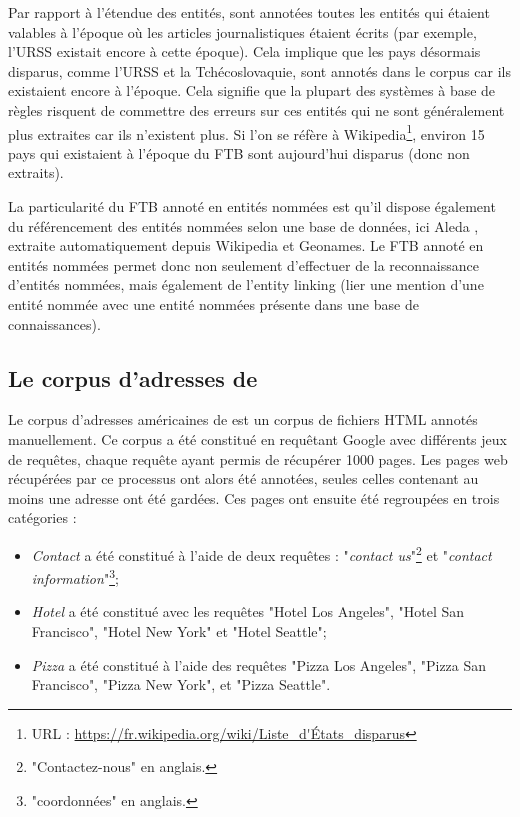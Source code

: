 \documentclass[12pt,a4paper,times,twoside,openright]{report}
\begin{document}
Par rapport à l'étendue des entités, sont annotées toutes les entités qui étaient valables à l'époque où les articles journalistiques étaient écrits (par exemple, l'URSS existait encore à cette époque). Cela implique que les pays désormais disparus, comme l'URSS et la Tchécoslovaquie, sont annotés dans le corpus car ils existaient encore à l'époque. Cela signifie que la plupart des systèmes à base de règles risquent de commettre des erreurs sur ces entités qui ne sont généralement plus extraites car ils n'existent plus. Si l'on se réfère à Wikipedia\footnote{URL : \url{https://fr.wikipedia.org/wiki/Liste_d'États_disparus}}, environ 15 pays qui existaient à l'époque du FTB sont aujourd'hui disparus (donc non extraits).

La particularité du FTB annoté en entités nommées est qu'il dispose également du référencement des entités nommées selon une base de données, ici Aleda \citep{sagot2012aleda}, extraite automatiquement depuis Wikipedia et Geonames. Le FTB annoté en entités nommées permet donc non seulement d'effectuer de la reconnaissance d'entités nommées, mais également de l'entity linking (lier une mention d'une entité nommée avec une entité nommées présente dans une base de connaissances).


        
        \subsection{Le corpus d'adresses de \citet{yu2007high}}
        \label{subsec:corpus-adresses}
Le corpus d'adresses américaines de \citet{yu2007high} est un corpus de fichiers HTML annotés manuellement. Ce corpus a été constitué en requêtant Google avec différents jeux de requêtes, chaque requête ayant permis de récupérer 1000 pages. Les pages web récupérées par ce processus ont alors été annotées, seules celles contenant au moins une adresse ont été gardées. Ces pages ont ensuite été regroupées en trois catégories : 

\begin{itemize}
\item \emph{Contact} a été constitué à l'aide de deux requêtes : "\textit{contact us}"\footnote{"Contactez-nous" en anglais.} et "\textit{contact information}"\footnote{"coordonnées" en anglais.};
\item \emph{Hotel} a été constitué avec les requêtes "Hotel Los Angeles", "Hotel San Francisco", "Hotel New York" et "Hotel Seattle";
\item \emph{Pizza} a été constitué à l'aide des requêtes "Pizza Los Angeles", "Pizza San Francisco", "Pizza New York", et "Pizza Seattle".
\end{itemize}
\end{document}
